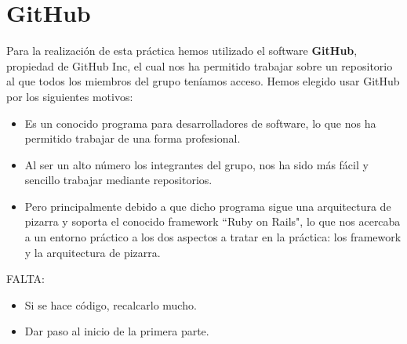 \color{black}
\section{GitHub}
Para la realización de esta práctica hemos utilizado el software \textbf{GitHub}, propiedad de 	{GitHub Inc}, el cual nos ha permitido trabajar sobre un repositorio al que todos los miembros del grupo teníamos acceso. Hemos elegido usar GitHub por los siguientes motivos:
\begin{itemize}
	\item Es un conocido programa para desarrolladores de software, lo que nos ha permitido trabajar de una forma profesional.
	\item Al ser un alto número los integrantes del grupo, nos ha sido más fácil y sencillo trabajar mediante repositorios. 
	\item Pero principalmente debido a que dicho programa sigue una arquitectura de pizarra y soporta el conocido framework ``Ruby on Rails", lo que nos acercaba a un entorno práctico a los dos aspectos a tratar en la práctica: los framework y la arquitectura de pizarra.
\end{itemize}

\color{red}
FALTA:
\begin{itemize}
\item Si se hace código, recalcarlo mucho.
\item Dar paso al inicio de la primera parte.
\end{itemize}
\color{black}

